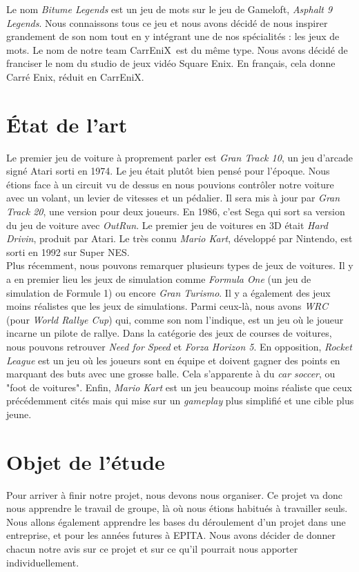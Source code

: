 \documentclass[12pt,a4paper]{article}
\newcommand{\CEX}{CarrEniX}
\begin{document}
  \indent Le nom \textit{Bitume Legends} est un jeu de mots sur le jeu de Gameloft, \textit{Asphalt 9 Legends}.
  Nous connaissons tous ce jeu et nous avons décidé de nous inspirer grandement de son nom tout en y intégrant
  une de nos spécialités : les jeux de mots. Le nom de notre team \CEX\, est du même type. Nous avons décidé
  de franciser le nom du studio de jeux vidéo Square Enix. En français, cela donne Carré Enix, réduit en
  \CEX.\\

\section{État de l'art}
  Le premier jeu de voiture à proprement parler est \textit{Gran Track 10}, un jeu d'arcade signé Atari 
  sorti en 1974. Le jeu était plutôt bien pensé pour l'époque. Nous étions face à un 
  circuit vu de dessus en nous pouvions contrôler notre voiture avec un volant, un levier de vitesses
  et un pédalier. Il sera mis à jour par \textit{Gran Track 20}, une version pour deux joueurs.
  En 1986, c'est Sega qui sort sa version du jeu de voiture avec \textit{OutRun}. Le premier 
  jeu de voitures en 3D était \textit{Hard Drivin}, produit par Atari. Le très connu \textit{Mario Kart},
  développé par Nintendo, est sorti en 1992 sur Super NES.\\

  \indent Plus récemment, nous pouvons remarquer plusieurs types de jeux de voitures. Il y a en premier lieu 
  les jeux de simulation comme \textit{Formula One} (un jeu de simulation de Formule 1) ou encore 
  \textit{Gran Turismo}. Il y a également des jeux moins réalistes
  que les jeux de simulations. Parmi ceux-là, nous avons \textit{WRC} (pour \textit{World Rallye Cup})
  qui, comme son nom l'indique, est un jeu où le joueur incarne un pilote de rallye. Dans la 
  catégorie des jeux de courses de voitures, nous pouvons retrouver 
  \textit{Need for Speed} et \textit{Forza Horizon 5}.
  En opposition, \textit{Rocket League} est un jeu où les joueurs sont en équipe  et doivent gagner des
  points en marquant des buts avec une grosse balle. Cela s'apparente à du \textit{car soccer}, ou "foot
  de voitures".
  Enfin, \textit{Mario Kart} est un jeu beaucoup moins réaliste
  que ceux précédemment cités mais qui mise sur un \textit{gameplay} plus simplifié et une cible plus jeune. 
 \clearpage

\section{Objet de l'étude}
  Pour arriver à finir notre projet, nous devons nous organiser.
  Ce projet va donc nous apprendre le travail de groupe, là où nous étions habitués à travailler seuls. 
  Nous allons également apprendre les bases du déroulement d'un projet dans une entreprise, 
  et pour les années futures à EPITA. Nous avons décider de donner chacun notre avis sur ce projet et sur ce 
  qu'il pourrait nous apporter individuellement.\\
\end{document}
